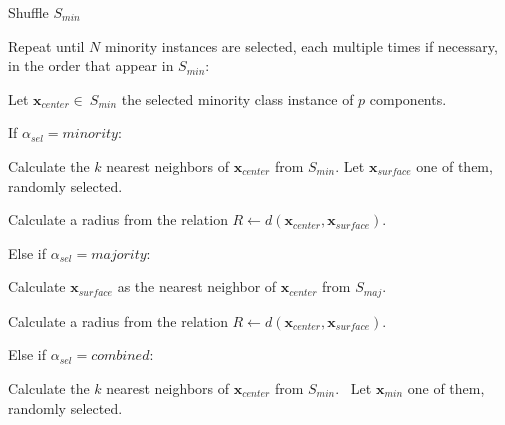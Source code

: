 \documentclass[parskip=full]{scrartcl}
\begin{document}
\begin{algorithm}

	\item Shuffle \( S_{min} \)

	\item Repeat until \( N \) minority instances are selected, each multiple times if necessary, in the order that appear in \( S_{min} \):

	\begin{algorithm}

		\item Let \( \textbf{x}_{center} \in \ S_{min} \) the selected minority class instance of \( p \) components.

		\item If \( \alpha_{sel} = minority \):
		
		\begin{algorithm}
			
			\item Calculate the \( k \) nearest neighbors of \( \textbf{x}_{center} \) from \( S_{min} \). Let \( \textbf{x}_{surface} \) one of them, randomly selected.
			
			\item Calculate a radius from the relation \( R \leftarrow d(\textbf{x}_{center}, \textbf{x}_{surface})  \).
			
		\end{algorithm}
	
		\item Else if \( \alpha_{sel} = majority \):
		
		\begin{algorithm}
			
			\item Calculate \( \textbf{x}_{surface} \) as the nearest neighbor of \( \textbf{x}_{center} \) from \( S_{maj}  \).
			
			\item Calculate a radius from the relation \( R \leftarrow d(\textbf{x}_{center}, \textbf{x}_{surface}) \).
			
		\end{algorithm}
	
		\item Else if \( \alpha_{sel} = combined \):
		
		\begin{algorithm}
			
			\item Calculate the \( k \) nearest neighbors of \( \textbf{x}_{center} \) from \( S_{min} \). \ Let \( \textbf{x}_{min} \) one of them, randomly selected.
			

\end{algorithm}
\end{algorithm}
\end{algorithm}
\end{document}

